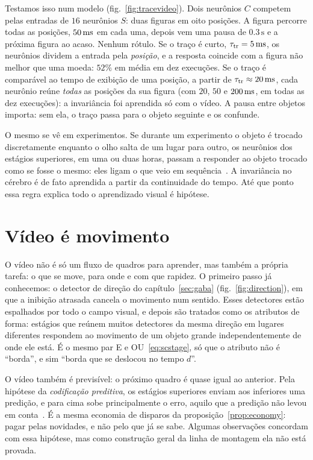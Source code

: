 Testamos isso num modelo (fig.~\ref{fig:tracevideo}). Dois neurônios $C$ competem pelas entradas de $16$ neurônios $S$: duas figuras em oito posições. A figura percorre todas as posições, $50\,\text{ms}$ em cada uma, depois vem uma pausa de $0.3\,\text{s}$ e a próxima figura ao acaso. Nenhum rótulo. Se o traço é curto, $\tau_{\text{tr}}=5\,\text{ms}$, os neurônios dividem a entrada pela \emph{posição}, e a resposta coincide com a figura não melhor que uma moeda: $52\%$ em média em dez execuções. Se o traço é comparável ao tempo de exibição de uma posição, a partir de $\tau_{\text{tr}}\approx20\,\text{ms}$, cada neurônio reúne \emph{todas} as posições da sua figura (com $20$, $50$ e $200\,\text{ms}$, em todas as dez execuções): a invariância foi aprendida só com o vídeo. A pausa entre objetos importa: sem ela, o traço passa para o objeto seguinte e os confunde.

O mesmo se vê em experimentos. Se durante um experimento o objeto é trocado discretamente enquanto o olho salta de um lugar para outro, os neurônios dos estágios superiores, em uma ou duas horas, passam a responder ao objeto trocado como se fosse o mesmo: eles ligam o que veio em sequência~\cite{LiDiCarlo2008}. A invariância no cérebro é de fato aprendida a partir da continuidade do tempo. Até que ponto essa regra explica todo o aprendizado visual é hipótese.

\section{Vídeo é movimento}

O vídeo não é só um fluxo de quadros para aprender, mas também a própria tarefa: o que se move, para onde e com que rapidez. O primeiro passo já conhecemos: o detector de direção do capítulo~\ref{sec:gaba} (fig.~\ref{fig:direction}), em que a inibição atrasada cancela o movimento num sentido. Esses detectores estão espalhados por todo o campo visual, e depois são tratados como os atributos de forma: estágios que reúnem muitos detectores da mesma direção em lugares diferentes respondem ao movimento de um objeto grande independentemente de onde ele está. É o mesmo par E e OU~\eqref{eq:scstage}, só que o atributo não é ``borda'', e sim ``borda que se deslocou no tempo $d$''.

O vídeo também é previsível: o próximo quadro é quase igual ao anterior. Pela hipótese da \emph{codificação preditiva}, os estágios superiores enviam aos inferiores uma predição, e para cima sobe principalmente o erro, aquilo que a predição não levou em conta~\cite{RaoBallard1999}. É a mesma economia de disparos da proposição~\ref{prop:economy}: pagar pelas novidades, e não pelo que já se sabe. Algumas observações concordam com essa hipótese, mas como construção geral da linha de montagem ela não está provada.

